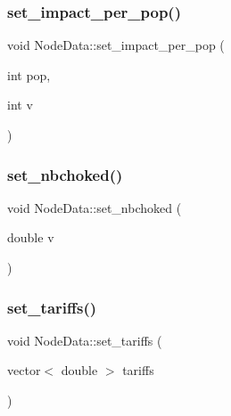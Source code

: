\subsubsection{\texorpdfstring{set\_impact\_per\_pop()}{set\_impact\_per\_pop()}}
{\footnotesize\ttfamily void Node\+Data\+::set\+\_\+impact\+\_\+per\+\_\+pop (\begin{DoxyParamCaption}\item[{int}]{pop,  }\item[{int}]{v }\end{DoxyParamCaption})\hspace{0.3cm}{\ttfamily [inline]}}

\mbox{\label{class_node_data_a6736522e19331356abc9a0d6ed8882fb}} 
\subsubsection{\texorpdfstring{set\_nbchoked()}{set\_nbchoked()}}
{\footnotesize\ttfamily void Node\+Data\+::set\+\_\+nbchoked (\begin{DoxyParamCaption}\item[{double}]{v }\end{DoxyParamCaption})\hspace{0.3cm}{\ttfamily [inline]}}

\mbox{\label{class_node_data_ae36ac9e76218d533a01501c8b67dc3de}} 
\subsubsection{\texorpdfstring{set\_tariffs()}{set\_tariffs()}}
{\footnotesize\ttfamily void Node\+Data\+::set\+\_\+tariffs (\begin{DoxyParamCaption}\item[{vector$<$ double $>$}]{tariffs }\end{DoxyParamCaption})\hspace{0.3cm}{\ttfamily [inline]}}

\mbox{\label{class_node_data_a0848066e27e3cb766039ee852d4c3f18}} 
